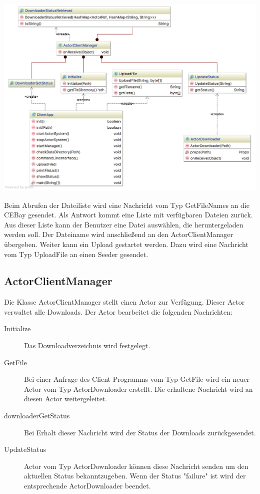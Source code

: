 \documentclass{scrartcl}
\begin{document}
\begin{center}
\includegraphics[width=.9\textwidth]{diagram_client.png}
\end{center}

Beim Abrufen der Dateiliste wird eine Nachricht vom Typ GetFileNames
an die CEBay gesendet. Als Antwort kommt eine Liste mit verfügbaren
Dateien zurück. Aus dieser Liste kann der Benutzer eine Datei
auswählen, die heruntergeladen werden soll. Der Dateiname wird
anschließend an den ActorClientManager übergeben. Weiter kann ein
Upload gestartet werden. Dazu wird eine Nachricht vom Typ UploadFile
an einen Seeder gesendet.
\subsection{ActorClientManager}
\label{sec:orgad638f8}
Die Klasse ActorClientManager stellt einen Actor zur Verfügung. Dieser
Actor verwaltet alle Downloads. Der Actor bearbeitet die folgenden
Nachrichten:

\begin{description}
\item[{Initialize}] Das Downloadverzeichnis wird festgelegt.
\item[{GetFile}] Bei einer Anfrage des Client Programms vom Typ GetFile
wird ein neuer Actor vom Typ ActorDownloader erstellt. Die
erhaltene Nachricht wird an diesen Actor weitergeleitet.
\item[{downloaderGetStatus}] Bei Erhalt dieser Nachricht wird der Status
der Downloads zurückgesendet.
\item[{UpdateStatus}] Actor vom Typ ActorDownloader können diese Nachricht
senden um den aktuellen Status bekanntzugeben. Wenn der Status
"failure" ist wird der entsprechende ActorDownloader beendet.
\end{description}
\end{document}
